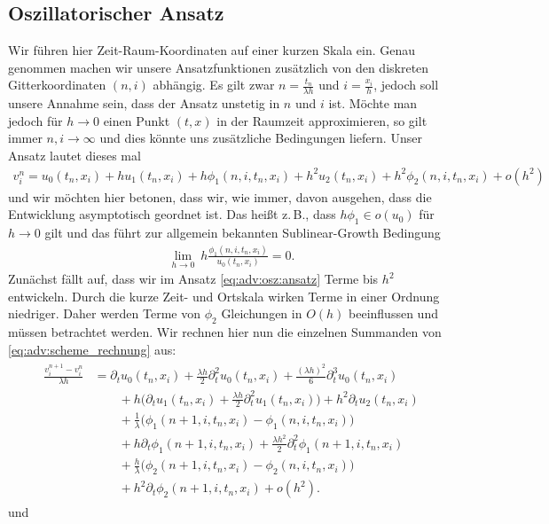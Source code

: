 \subsection {Oszillatorischer Ansatz} \label{sec:osz1}

Wir führen hier Zeit-Raum-Koordinaten auf einer kurzen Skala ein.
Genau genommen machen wir unsere Ansatzfunktionen zusätzlich von den diskreten Gitterkoordinaten $(n,i)$ abhängig.
Es gilt zwar $n = \frac {t_n} {\lambda h}$ und $i = \frac {x_i}{h}$, jedoch soll unsere Annahme sein, dass der Ansatz unstetig in $n$ und $i$ ist.
Möchte man jedoch für $h \to 0$ einen Punkt $(t,x)$ in der Raumzeit approximieren, so gilt immer $n,i \to \infty$ und dies könnte uns zusätzliche Bedingungen liefern.
Unser Ansatz lautet dieses mal
\begin{align}\label{eq:adv:osz:ansatz}
v^n_i = u_0(t_n, x_i) + h u_1(t_n, x_i) +  h \phi_1(n, i, t_n, x_i) + h^2 u_2(t_n, x_i) + h^2 \phi_2(n, i, t_n, x_i) + o(h^2)
\end{align}
und wir möchten hier betonen, dass wir, wie immer, davon ausgehen, dass die Entwicklung asymptotisch geordnet ist.
Das heißt z.\,B., dass $h \phi_1 \in o(u_0)$ für $h \to 0$ gilt und das führt zur allgemein bekannten Sublinear-Growth Bedingung
\begin{align}\label{eq:osz:sublineargrowth}
\lim_{h \to 0} \: h \frac{\phi_1(n, i, t_n, x_i)}{u_0(t_n, x_i)} = 0.
\end{align}
Zunächst fällt auf, dass wir im Ansatz \eqref{eq:adv:osz:ansatz} Terme bis $h^2$ entwickeln.
Durch die kurze Zeit- und Ortskala wirken Terme in einer Ordnung niedriger.
Daher werden Terme von $\phi_2$ Gleichungen in $O(h)$ beeinflussen und müssen betrachtet werden.
Wir rechnen hier nun die einzelnen Summanden von \eqref{eq:adv:scheme_rechnung} aus:
{\small
\begin{align} \label{eq:adv:osz:diff1}
\begin{split}
\frac {v^{n+1}_i - v^n_i} {\lambda h}
&= \partial_t u_0(t_n, x_i) + \frac {\lambda h}{2} \partial^2_t u_0(t_n, x_i) + \frac {(\lambda h)^2}{6} \partial^3_t u_0(t_n, x_i)\\
&\qquad + h \bigl( \partial_t u_1(t_n, x_i) + \frac {\lambda h}{2} \partial^2_t u_1(t_n, x_i) \bigr) + h^2 \partial_t u_2(t_n, x_i)\\
&\qquad + \frac 1 \lambda \bigl( \phi_1(n+1, i, t_n, x_i) - \phi_1(n, i, t_n, x_i) \bigr)\\
&\qquad + h \partial_t \phi_1(n+1, i, t_n, x_i) + \frac {\lambda h^2}{2} \partial^2_t \phi_1(n+1, i, t_n, x_i)\\
&\qquad + \frac h \lambda \bigl( \phi_2(n+1, i, t_n, x_i) - \phi_2(n, i, t_n, x_i) \bigr)\\
&\qquad + h^2 \partial_t \phi_2(n+1, i, t_n, x_i) + o(h^2).
\end{split}
\end{align}
} und
